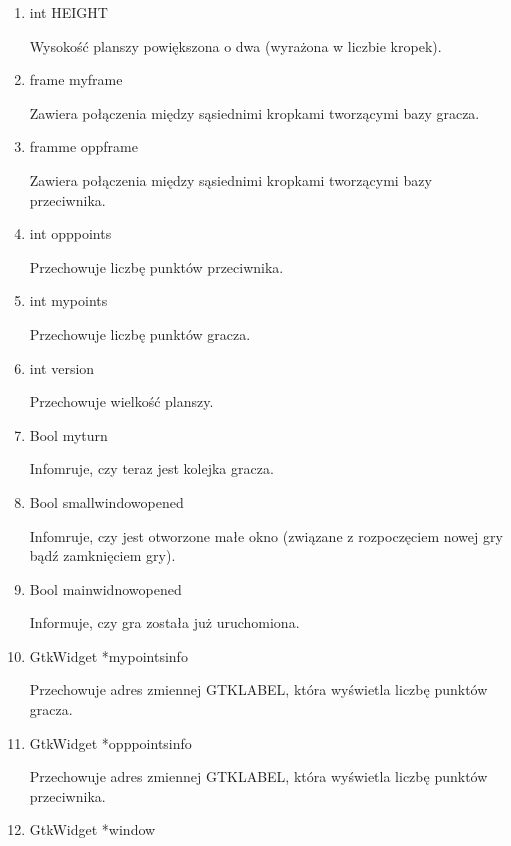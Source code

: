 \documentclass{article}
\begin{document}
\begin{enumerate}
\begin{enumerate}
\item int HEIGHT

Wysokość planszy powiększona o dwa (wyrażona w liczbie kropek).

\item frame my\textunderscore frame

Zawiera połączenia między sąsiednimi kropkami tworzącymi bazy gracza.

\item framme opp\textunderscore frame

Zawiera połączenia między sąsiednimi kropkami tworzącymi bazy przeciwnika.

\item int opp\textunderscore points

Przechowuje liczbę punktów przeciwnika.

\item int my\textunderscore points

Przechowuje liczbę punktów gracza.

\item int version

Przechowuje wielkość planszy.

\item \textunderscore Bool my\textunderscore turn

Infomruje, czy teraz jest kolejka gracza.

\item \textunderscore Bool small\textunderscore window\textunderscore opened

Infomruje, czy jest otworzone małe okno (związane z rozpoczęciem nowej gry bądź zamknięciem gry).

\item \textunderscore  Bool main\textunderscore widnow\textunderscore opened

Informuje, czy gra została już uruchomiona.

\item GtkWidget *mypoints\textunderscore info

Przechowuje adres zmiennej GTK\textunderscore LABEL, która wyświetla liczbę punktów gracza.

\item GtkWidget *opppoints\textunderscore info

Przechowuje adres zmiennej GTK\textunderscore LABEL, która wyświetla liczbę punktów przeciwnika.

\item GtkWidget *window


\end{enumerate}
\end{enumerate}
\end{document}

